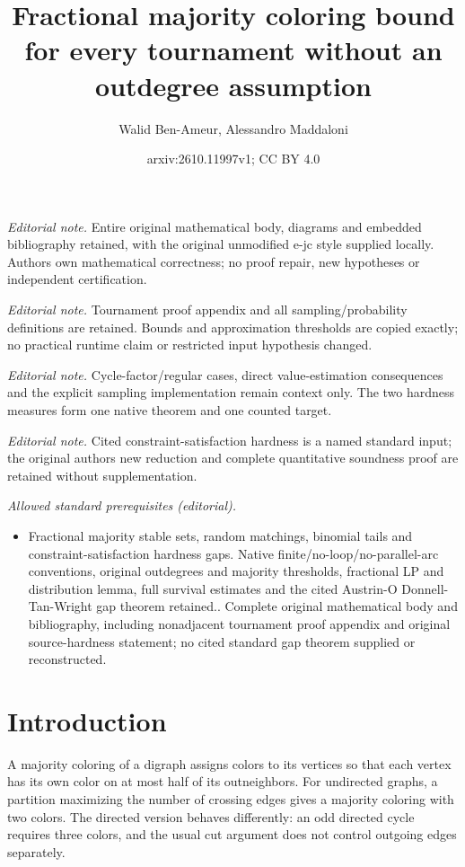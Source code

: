 \documentclass[10pt,a4paper]{article}
\title{Fractional majority coloring bound for every tournament without an outdegree assumption}
\author{Walid Ben-Ameur, Alessandro Maddaloni}
\date{arxiv:2610.11997v1; CC BY 4.0}
\begin{document}
\maketitle
\noindent\textit{Editorial note.} Entire original mathematical body, diagrams and embedded bibliography retained, with the original unmodified e-jc style supplied locally. Authors own mathematical correctness; no proof repair, new hypotheses or independent certification.\par\medskip
\noindent\textit{Editorial note.} Tournament proof appendix and all sampling/probability definitions are retained. Bounds and approximation thresholds are copied exactly; no practical runtime claim or restricted input hypothesis changed.\par\medskip
\noindent\textit{Editorial note.} Cycle-factor/regular cases, direct value-estimation consequences and the explicit sampling implementation remain context only. The two hardness measures form one native theorem and one counted target.\par\medskip
\noindent\textit{Editorial note.} Cited constraint-satisfaction hardness is a named standard input; the original authors new reduction and complete quantitative soundness proof are retained without supplementation.\par\medskip
\noindent\textit{Allowed standard prerequisites (editorial).}\begin{itemize}
\item Fractional majority stable sets, random matchings, binomial tails and constraint-satisfaction hardness gaps. Native finite/no-loop/no-parallel-arc conventions, original outdegrees and majority thresholds, fractional LP and distribution lemma, full survival estimates and the cited Austrin-O Donnell-Tan-Wright gap theorem retained.. Complete original mathematical body and bibliography, including nonadjacent tournament proof appendix and original source-hardness statement; no cited standard gap theorem supplied or reconstructed.
\end{itemize}\medskip
\section{Introduction}
A majority coloring of a digraph assigns colors to its vertices so that each vertex has its own color on at most half of its outneighbors. For undirected graphs, a partition maximizing the number of crossing edges gives a majority coloring with two colors. The directed version behaves differently: an odd directed cycle requires three colors, and the usual cut argument does not control outgoing edges separately.
\end{document}
